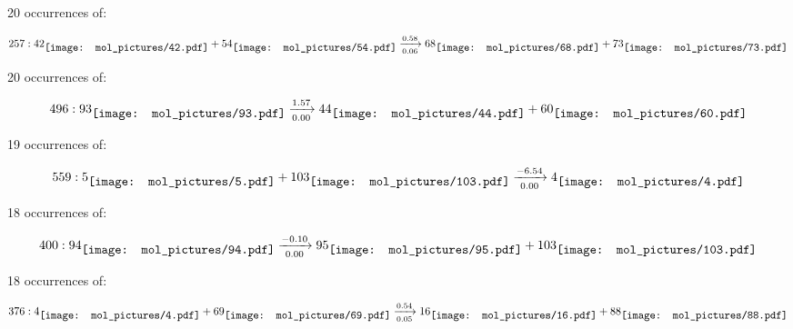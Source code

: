 \documentclass{article}
\begin{document}
\vspace{1cm}


20 occurrences of:

$$
257:  
42
\raisebox{-.5\height}{\texttt{[image: mol\_pictures/42.pdf]}}
+
54
\raisebox{-.5\height}{\texttt{[image: mol\_pictures/54.pdf]}}
\xrightarrow[0.06]{0.58}
68
\raisebox{-.5\height}{\texttt{[image: mol\_pictures/68.pdf]}}
+
73
\raisebox{-.5\height}{\texttt{[image: mol\_pictures/73.pdf]}}
$$



\vspace{1cm}


20 occurrences of:

$$
496:  
93
\raisebox{-.5\height}{\texttt{[image: mol\_pictures/93.pdf]}}
\xrightarrow[0.00]{1.57}
44
\raisebox{-.5\height}{\texttt{[image: mol\_pictures/44.pdf]}}
+
60
\raisebox{-.5\height}{\texttt{[image: mol\_pictures/60.pdf]}}
$$



\vspace{1cm}


19 occurrences of:

$$
559:  
5
\raisebox{-.5\height}{\texttt{[image: mol\_pictures/5.pdf]}}
+
103
\raisebox{-.5\height}{\texttt{[image: mol\_pictures/103.pdf]}}
\xrightarrow[0.00]{-6.54}
4
\raisebox{-.5\height}{\texttt{[image: mol\_pictures/4.pdf]}}
$$



\vspace{1cm}


18 occurrences of:

$$
400:  
94
\raisebox{-.5\height}{\texttt{[image: mol\_pictures/94.pdf]}}
\xrightarrow[0.00]{-0.10}
95
\raisebox{-.5\height}{\texttt{[image: mol\_pictures/95.pdf]}}
+
103
\raisebox{-.5\height}{\texttt{[image: mol\_pictures/103.pdf]}}
$$



\vspace{1cm}


18 occurrences of:

$$
376:  
4
\raisebox{-.5\height}{\texttt{[image: mol\_pictures/4.pdf]}}
+
69
\raisebox{-.5\height}{\texttt{[image: mol\_pictures/69.pdf]}}
\xrightarrow[0.05]{0.54}
16
\raisebox{-.5\height}{\texttt{[image: mol\_pictures/16.pdf]}}
+
88
\raisebox{-.5\height}{\texttt{[image: mol\_pictures/88.pdf]}}
$$
\end{document}
